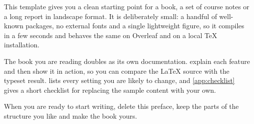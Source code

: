 
This template gives you a clean starting point for a book, a set of course
notes or a long report in landscape format. It is deliberately small: a
handful of well-known packages, no external fonts and a single lightweight
figure, so it compiles in a few seconds and behaves the same on Overleaf and
on a local \TeX{} installation.

The book you are reading doubles as its own documentation. 
explain each feature and then show it in action, so you can compare the
\LaTeX{} source with the typeset result. 
lists every setting you are likely to change, and \cref{app:checklist}
gives a short checklist for replacing the sample content with your own.

When you are ready to start writing, delete this preface, keep the parts of
the structure you like and make the book yours.

